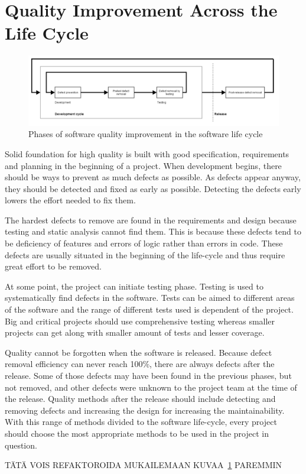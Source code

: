 \section{Quality Improvement Across the Life Cycle}

\begin{figure}[t]
\begin{center}
\includegraphics[width=1.0\textwidth]{image/quality_lifecycle.png}
\end{center}
\caption{Phases of software quality improvement in the software life cycle}
\label{fig:quality_life_cycle}
\end{figure}

Solid foundation for high quality is built with good specification, requirements and planning in the beginning of a project. When development begins, there should be ways to prevent as much defects as possible. As defects appear anyway, they should be detected and fixed as early as possible. Detecting the defects early lowers the effort needed to fix them. 

The hardest defects to remove are found in the requirements and design because testing and static analysis cannot find them. This is because these defects tend to be deficiency of features and errors of logic rather than errors in code. These defects are usually situated in the beginning of the life-cycle and thus require great effort to be removed. 

At some point, the project can initiate testing phase. Testing is used to systematically find defects in the software. Tests can be aimed to different areas of the software and the range of different tests used is dependent of the project. Big and critical projects should use comprehensive testing whereas smaller projects can get along with smaller amount of tests and lesser coverage.

Quality cannot be forgotten when the software is released. Because defect removal efficiency can never reach 100\%, there are always defects after the release. Some of those defects may have been found in the previous phases, but not removed, and other defects were unknown to the project team at the time of the release. Quality methods after the release should include detecting and removing defects and increasing the design for increasing the maintainability. With this range of methods divided to the software life-cycle, every project should choose the most appropriate methods to be used in the project in question.


TÄTÄ VOIS REFAKTOROIDA MUKAILEMAAN KUVAA~\ref{fig:quality_life_cycle} PAREMMIN

